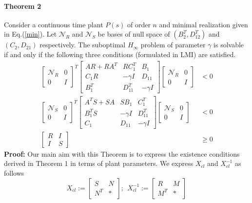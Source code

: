 \documentclass[a4paper,12pt]{article}
\begin{document}
	\paragraph{Theorem 2}
	Consider a continuous time plant $P(s)$ of order $n$ and minimal realization given in Eq.(\ref{min}). Let $\mathscr{N}_{R}$ and $\mathscr{N}_{S}$ be bases of null space of $(B_{2}^{T}, D_{12}^{T})$ and $(C_{2},D_{21})$ respectively. The suboptimal $H_{\infty}$ problem of parameter $\gamma$ is solvable if and only if the following three conditions (formulated in LMI) are satisfied.
	\begin{align}
	\label{th2eq1}
	\begin{bmatrix}
	\mathscr{N}_{R} & 0 \\
	0 & I
	\end{bmatrix}^{T}
	\begin{bmatrix}
	AR+RA^{T} & RC_{1}^{T} & B_{1} \\
	C_{1}R & -\gamma I & D_{11} \\
	B_{1}^{T} & D_{11}^{T} & -\gamma I
	\end{bmatrix}
	\begin{bmatrix}
	\mathscr{N}_{R} & 0 \\
	0 & I
	\end{bmatrix} &<0 \\
	\label{th2eq2}
	\begin{bmatrix}
	\mathscr{N}_{S} & 0 \\
	0 & I
	\end{bmatrix}^{T}
	\begin{bmatrix}
	A^{T}S+SA & SB_{1} & C_{1}^{T} \\
	B_{1}^{T}S & -\gamma I & D_{11}^{T} \\
	C_{1} & D_{11} & -\gamma I
	\end{bmatrix}
	\begin{bmatrix}
	\mathscr{N}_{S} & 0 \\ 
	0 & I
	\end{bmatrix} &<0 \\
	\label{th2eq3}
	\begin{bmatrix}
	R & I\\I & S
	\end{bmatrix} &\geq 0
	\end{align}
	\textbf{Proof:} Our main aim with this Theorem is to express the existence conditions derived in Theorem 1 in terms of plant parameters. We express $X_{cl}$ and $X_{cl}^{-1}$ as follows
	\begin{equation}
	X_{cl} := \begin{bmatrix}
	S & N \\
	N^{T} & *
	\end{bmatrix}; \: \:
	X_{cl}^{-1} := \begin{bmatrix}
	R & M \\
	M^{T} & *
	\end{bmatrix}
	\label{Xcl_partition}
	\end{equation}
\end{document}

